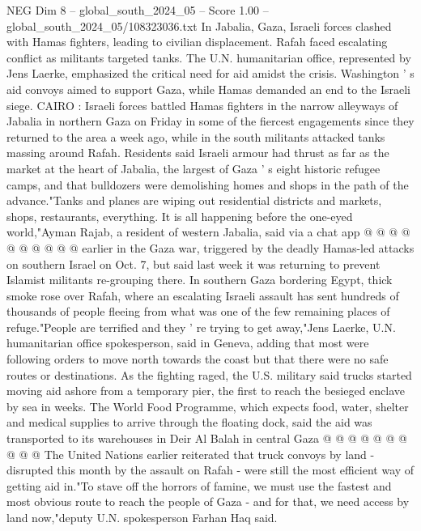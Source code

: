 \begin{textsample}{NEG Dim 8 – global\_south\_2024\_05 – Score 1.00 – global\_south\_2024\_05/108323036.txt}  \label{ex:f8_neg_238}
In Jabalia, Gaza, Israeli forces clashed with Hamas fighters, leading to civilian displacement.
Rafah faced escalating conflict as militants targeted tanks.
The U.N. humanitarian office, represented by Jens Laerke, emphasized the critical need for aid amidst the crisis.
Washington ' s aid convoys aimed to support Gaza, while Hamas demanded an end to the Israeli siege.
CAIRO : Israeli forces battled Hamas fighters in the narrow alleyways of Jabalia in northern Gaza on Friday in some of the fiercest engagements since they returned to the area a week ago, while in the south militants attacked tanks massing around Rafah.
Residents said Israeli armour had thrust as far as the market at the heart of Jabalia, the largest of Gaza ' s eight historic refugee camps, and that bulldozers were demolishing homes and shops in the path of the advance."Tanks and planes are wiping out residential districts and markets, shops, restaurants, everything.
It is all happening before the one-eyed world,"Ayman Rajab, a resident of western Jabalia, said via a chat app @ @ @ @ @ @ @ @ @ @ earlier in the Gaza war, triggered by the deadly Hamas-led attacks on southern Israel on Oct. 7, but said last week it was returning to prevent Islamist militants re-grouping there.
In southern Gaza bordering Egypt, thick smoke rose over Rafah, where an escalating Israeli assault has sent hundreds of thousands of people fleeing from what was one of the few remaining places of refuge."People are terrified and they ' re trying to get away,"Jens Laerke, U.N. humanitarian office spokesperson, said in Geneva, adding that most were following orders to move north towards the coast but that there were no safe routes or destinations.
As the fighting raged, the U.S. military said trucks started moving aid ashore from a temporary pier, the first to reach the besieged enclave by sea in weeks.
The World Food Programme, which expects food, water, shelter and medical supplies to arrive through the floating dock, said the aid was transported to its warehouses in Deir Al Balah in central Gaza @ @ @ @ @ @ @ @ @ @ The United Nations earlier reiterated that truck convoys by land - disrupted this month by the assault on Rafah - were still the most efficient way of getting aid in."To stave off the horrors of famine, we must use the fastest and most obvious route to reach the people of Gaza - and for that, we need access by land now,"deputy U.N. spokesperson Farhan Haq said.

\end{textsample}
